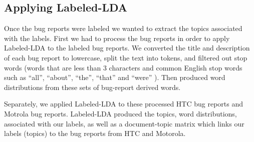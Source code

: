 \documentclass[10pt, conference, compsocconf]{IEEEtran}
\begin{document}
\subsection{Applying Labeled-LDA}





Once the bug reports were labeled we wanted to extract the topics
associated with the labels. First we had to process the bug reports 
in order to apply Labeled-LDA to the labeled bug reports. 
We converted the title and description of each bug report to lowercase,
split the text into tokens, and filtered out stop words (words that are less than 3 characters and
common English stop words such as ``all'', ``about'', ``the'',
``that'' and ``were'' ). Then produced word distributions from
these sets of bug-report derived words.

Separately, we applied Labeled-LDA to these processed HTC bug reports and Motrola bug reports.
Labeled-LDA produced the topics, word distributions, associated
with our labels, as well as a document-topic matrix which links our
labels (topics) to the bug reports from HTC and Motorola.
\end{document}

